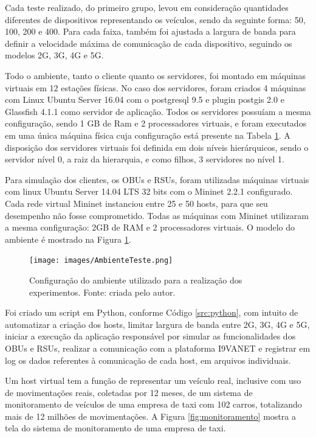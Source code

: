 \documentclass[
	12pt,				%
	oneside,			%
	a4paper,			%
	english,			%
	brazil				%
	]{abntex2ppgsi}
\begin{document}
Cada teste realizado, do primeiro grupo, levou em consideração quantidades diferentes de dispositivos representando os veículos, sendo da seguinte forma: 50, 100, 200 e 400. Para cada faixa, também foi ajustada a largura de banda para definir a velocidade máxima de comunicação de cada dispositivo, seguindo os modelos 2G, 3G, 4G e 5G.

Todo o ambiente, tanto o cliente quanto os servidores, foi montado em máquinas virtuais em 12 estações físicas. No caso dos servidores,  foram criados 4 máquinas com Linux Ubuntu Server 16.04 com o postgresql 9.5 e plugin postgis 2.0 e Glassfish 4.1.1 como servidor de aplicação. Todos os servidores possuíam a mesma configuração, sendo 1 GB de Ram e 2 processadores virtuais, e foram executados em uma única máquina física cuja configuração está presente na Tabela \ref{fig:cenarioConsiderado}. A disposição dos servidores virtuais foi definida em dois níveis hierárquicos, sendo o servidor nível 0, a raiz da hierarquia, e como filhos,  3 servidores no nível 1.


Para simulação dos clientes, os OBUs e RSUs, foram utilizadas máquinas virtuais com linux Ubuntu Server 14.04 LTS 32 bits com o Mininet 2.2.1 configurado. Cada rede virtual Mininet instanciou entre 25 e 50 hosts, para que seu desempenho não fosse comprometido. Todas as máquinas com Mininet  utilizaram a mesma configuração:  2GB de RAM e 2 processadores virtuais. O modelo do ambiente é mostrado na Figura \ref{fig:cenarioConsiderado}.


\begin{figure}[h!]
	\centering
	\texttt{[image: images/AmbienteTeste.png]}
	\caption{Configuração do ambiente utilizado para a realização dos experimentos. Fonte: criada pelo autor.}
	\label{fig:cenarioConsiderado}
\end{figure}

Foi criado um script em Python, conforme Código \ref{src:python}, com intuito de automatizar a criação dos hosts, limitar largura de banda entre 2G, 3G, 4G e 5G, iniciar a execução da aplicação responsável por simular as funcionalidades dos OBUs e RSUs,  realizar a comunicação com a plataforma I9VANET e registrar em log os dados referentes à comunicação de cada host, em arquivos individuais.

Um host virtual tem a função de representar um veículo real, inclusive com uso de movimentações reais, coletadas por 12 meses, de um sistema de monitoramento de veículos de uma empresa de taxi com 102 carros, totalizando mais de 12 milhões de movimentações. A Figura \ref{fig:monitoramento} mostra a tela do sistema de monitoramento de uma empresa de taxi.
\end{document}
